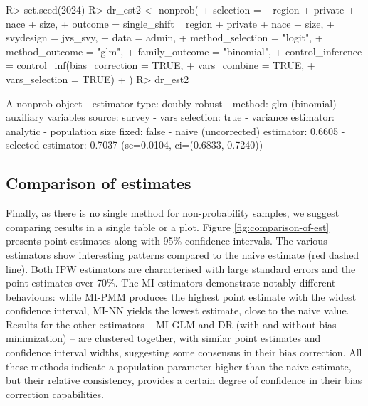 \documentclass[
]{jss}
\begin{document}
\begin{CodeChunk}
\begin{CodeInput}
R> set.seed(2024)
R> dr_est2 <- nonprob(
+   selection = ~ region + private + nace + size,
+   outcome = single_shift ~ region + private + nace + size,
+   svydesign = jvs_svy,
+   data = admin,
+   method_selection = "logit",
+   method_outcome = "glm",
+   family_outcome = "binomial",
+   control_inference = control_inf(bias_correction = TRUE,
+                                   vars_combine = TRUE,
+                                   vars_selection = TRUE)
+ )
R> dr_est2
\end{CodeInput}
\begin{CodeOutput}
A nonprob object
 - estimator type: doubly robust
 - method: glm (binomial)
 - auxiliary variables source: survey
 - vars selection: true
 - variance estimator: analytic
 - population size fixed: false
 - naive (uncorrected) estimator: 0.6605
 - selected estimator: 0.7037 (se=0.0104, ci=(0.6833, 0.7240))
\end{CodeOutput}
\end{CodeChunk}

\subsection{Comparison of estimates}\label{comparison-of-estimates}

Finally, as there is no single method for non-probability samples, we
suggest comparing results in a single table or a plot. Figure
\ref{fig:comparison-of-est} presents point estimates along with 95\%
confidence intervals. The various estimators show interesting patterns
compared to the naive estimate (red dashed line). Both IPW estimators
are characterised with large standard errors and the point estimates
over 70\%. The MI estimators demonstrate notably different behaviours:
while MI-PMM produces the highest point estimate with the widest
confidence interval, MI-NN yields the lowest estimate, close to the
naive value. Results for the other estimators -- MI-GLM and DR (with and
without bias minimization) -- are clustered together, with similar point
estimates and confidence interval widths, suggesting some consensus in
their bias correction. All these methods indicate a population parameter
higher than the naive estimate, but their relative consistency, provides
a certain degree of confidence in their bias correction capabilities.
\end{document}
